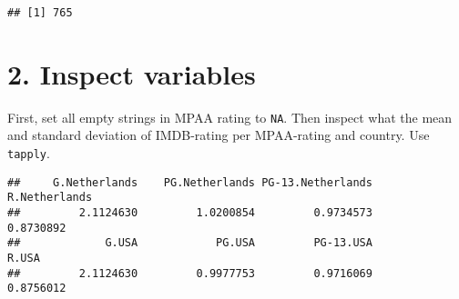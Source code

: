 \documentclass[
]{article}
\newenvironment{Shaded}{\begin{snugshade}}{\end{snugshade}}
\newcommand{\CommentTok}[1]{\textcolor[rgb]{0.56,0.35,0.01}{\textit{#1}}}
\newcommand{\DataTypeTok}[1]{\textcolor[rgb]{0.13,0.29,0.53}{#1}}
\newcommand{\DecValTok}[1]{\textcolor[rgb]{0.00,0.00,0.81}{#1}}
\newcommand{\FloatTok}[1]{\textcolor[rgb]{0.00,0.00,0.81}{#1}}
\newcommand{\KeywordTok}[1]{\textcolor[rgb]{0.13,0.29,0.53}{\textbf{#1}}}
\newcommand{\NormalTok}[1]{#1}
\newcommand{\OperatorTok}[1]{\textcolor[rgb]{0.81,0.36,0.00}{\textbf{#1}}}
\newcommand{\OtherTok}[1]{\textcolor[rgb]{0.56,0.35,0.01}{#1}}
\newcommand{\StringTok}[1]{\textcolor[rgb]{0.31,0.60,0.02}{#1}}
\begin{document}
\begin{Shaded}
\end{Shaded}

\begin{verbatim}
## [1] 765
\end{verbatim}

\hypertarget{inspect-variables}{%
\section{2. Inspect variables}\label{inspect-variables}}

First, set all empty strings in MPAA rating to \texttt{NA}. Then inspect
what the mean and standard deviation of IMDB-rating per MPAA-rating and
country. Use \texttt{tapply}.

\begin{Shaded}
\end{Shaded}

\begin{verbatim}
##     G.Netherlands    PG.Netherlands PG-13.Netherlands     R.Netherlands 
##         2.1124630         1.0200854         0.9734573         0.8730892 
##             G.USA            PG.USA         PG-13.USA             R.USA 
##         2.1124630         0.9977753         0.9716069         0.8756012
\end{verbatim}

\begin{Shaded}
\end{Shaded}
\end{document}
